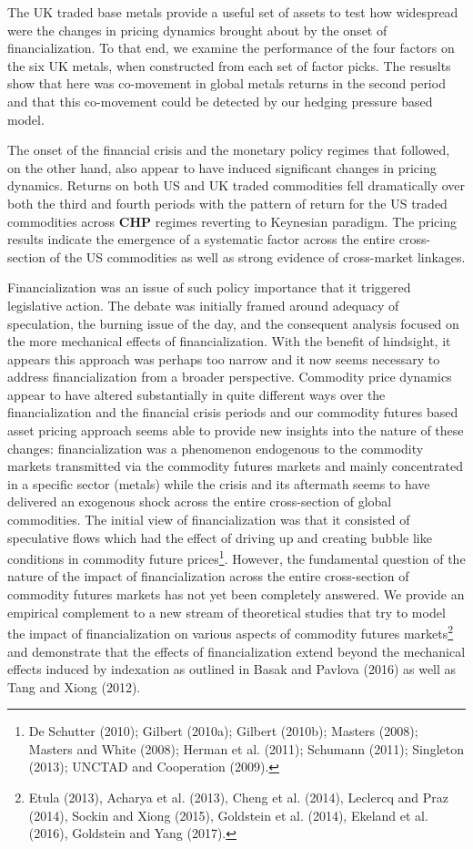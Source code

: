 \documentclass[]{elsarticle} %
\begin{document}
The UK traded base metals provide a useful set of assets to test how
widespread were the changes in pricing dynamics brought about by the
onset of financialization. To that end, we examine the performance of
the four factors on the six UK metals, when constructed from each set of
factor picks. The resuslts show that here was co-movement in global
metals returns in the second period and that this co-movement could be
detected by our hedging pressure based model.

The onset of the financial crisis and the monetary policy regimes that
followed, on the other hand, also appear to have induced significant
changes in pricing dynamics. Returns on both US and UK traded
commodities fell dramatically over both the third and fourth periods
with the pattern of return for the US traded commodities across
\textbf{CHP} regimes reverting to Keynesian paradigm. The pricing
results indicate the emergence of a systematic factor across the entire
cross-section of the US commodities as well as strong evidence of
cross-market linkages.

Financialization was an issue of such policy importance that it
triggered legislative action. The debate was initially framed around
adequacy of speculation, the burning issue of the day, and the
consequent analysis focused on the more mechanical effects of
financialization. With the benefit of hindsight, it appears this
approach was perhaps too narrow and it now seems necessary to address
financialization from a broader perspective. Commodity price dynamics
appear to have altered substantially in quite different ways over the
financialization and the financial crisis periods and our commodity
futures based asset pricing approach seems able to provide new insights
into the nature of these changes: financialization was a phenomenon
endogenous to the commodity markets transmitted via the commodity
futures markets and mainly concentrated in a specific sector (metals)
while the crisis and its aftermath seems to have delivered an exogenous
shock across the entire cross-section of global commodities. The initial
view of financialization was that it consisted of speculative flows
which had the effect of driving up and creating bubble like conditions
in commodity future prices\footnote{De Schutter (2010); Gilbert (2010a);
  Gilbert (2010b); Masters (2008); Masters and White (2008); Herman et
  al. (2011); Schumann (2011); Singleton (2013); UNCTAD and Cooperation
  (2009).}. However, the fundamental question of the nature of the
impact of financialization across the entire cross-section of commodity
futures markets has not yet been completely answered. We provide an
empirical complement to a new stream of theoretical studies that try to
model the impact of financialization on various aspects of commodity
futures markets\footnote{Etula (2013), Acharya et al. (2013), Cheng et
  al. (2014), Leclercq and Praz (2014), Sockin and Xiong (2015),
  Goldstein et al. (2014), Ekeland et al. (2016), Goldstein and Yang
  (2017).} and demonstrate that the effects of financialization extend
beyond the mechanical effects induced by indexation as outlined in Basak
and Pavlova (2016) as well as Tang and Xiong (2012).
\end{document}
